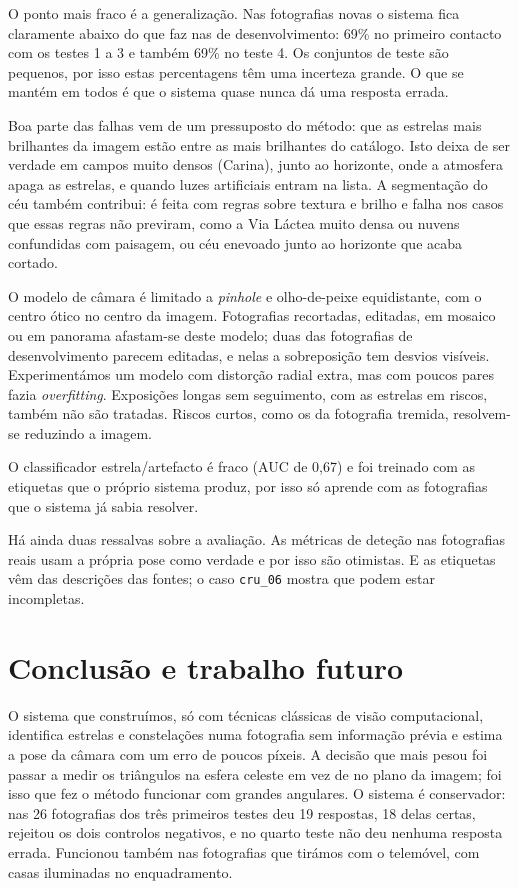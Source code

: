 \documentclass[11pt,a4paper]{article}
\begin{document}
O ponto mais fraco é a generalização. Nas fotografias novas o sistema fica
claramente abaixo do que faz nas de desenvolvimento: 69\% no primeiro
contacto com os testes 1 a 3 e também 69\% no teste 4. Os conjuntos de teste
são pequenos, por isso estas percentagens têm uma incerteza grande. O que se
mantém em todos é que o sistema quase nunca dá uma resposta errada.

Boa parte das falhas vem de um pressuposto do método: que as estrelas mais
brilhantes da imagem estão entre as mais brilhantes do catálogo. Isto deixa
de ser verdade em campos muito densos (Carina), junto ao horizonte, onde a
atmosfera apaga as estrelas, e quando luzes artificiais entram na lista. A
segmentação do céu também contribui: é feita com regras sobre textura e
brilho e falha nos casos que essas regras não previram, como a Via Láctea
muito densa ou nuvens confundidas com paisagem, ou céu enevoado junto ao
horizonte que acaba cortado.

O modelo de câmara é limitado a \emph{pinhole} e olho-de-peixe equidistante,
com o centro ótico no centro da imagem. Fotografias recortadas, editadas, em
mosaico ou em panorama afastam-se deste modelo; duas das fotografias de
desenvolvimento parecem editadas, e nelas a sobreposição tem desvios
visíveis. Experimentámos um modelo com distorção radial extra, mas com
poucos pares fazia \emph{overfitting}. Exposições longas sem seguimento, com
as estrelas em riscos, também não são tratadas. Riscos curtos, como os da
fotografia tremida, resolvem-se reduzindo a imagem.

O classificador estrela/artefacto é fraco (AUC de 0,67) e foi treinado com
as etiquetas que o próprio sistema produz, por isso só aprende com as
fotografias que o sistema já sabia resolver.

Há ainda duas ressalvas sobre a avaliação. As métricas de deteção nas
fotografias reais usam a própria pose como verdade e por isso são otimistas.
E as etiquetas vêm das descrições das fontes; o caso \texttt{cru\_06} mostra
que podem estar incompletas.

\section{Conclusão e trabalho futuro}

O sistema que construímos, só com técnicas clássicas de visão computacional,
identifica estrelas e constelações numa fotografia sem informação prévia e
estima a pose da câmara com um erro de poucos píxeis. A decisão que mais
pesou foi passar a medir os triângulos na esfera celeste em vez de no plano
da imagem; foi isso que fez o método funcionar com grandes angulares. O
sistema é conservador: nas 26 fotografias dos três primeiros testes deu 19
respostas, 18 delas certas, rejeitou os dois controlos negativos, e no
quarto teste não deu nenhuma resposta errada. Funcionou também nas
fotografias que tirámos com o telemóvel, com casas iluminadas no
enquadramento.
\end{document}
